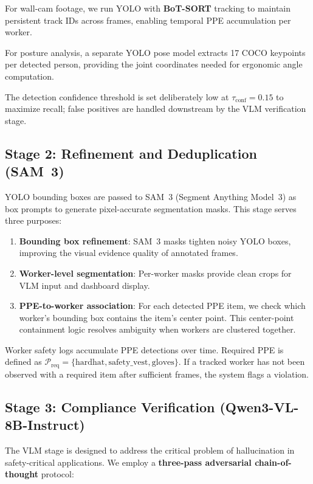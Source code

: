 \documentclass[11pt, twocolumn]{article}
\begin{document}
For wall-cam footage, we run YOLO with \textbf{BoT-SORT} tracking to maintain persistent track IDs across frames, enabling temporal PPE accumulation per worker.

For posture analysis, a separate YOLO pose model extracts 17 COCO keypoints per detected person, providing the joint coordinates needed for ergonomic angle computation.

The detection confidence threshold is set deliberately low at $\tau_{\text{conf}} = 0.15$ to maximize recall; false positives are handled downstream by the VLM verification stage.

\subsection{Stage 2: Refinement and Deduplication (SAM~3)}

YOLO bounding boxes are passed to SAM~3 (Segment Anything Model~3) as box prompts to generate pixel-accurate segmentation masks. This stage serves three purposes:

\begin{enumerate}[nosep, leftmargin=*]
    \item \textbf{Bounding box refinement}: SAM~3 masks tighten noisy YOLO boxes, improving the visual evidence quality of annotated frames.
    \item \textbf{Worker-level segmentation}: Per-worker masks provide clean crops for VLM input and dashboard display.
    \item \textbf{PPE-to-worker association}: For each detected PPE item, we check which worker's bounding box contains the item's center point. This center-point containment logic resolves ambiguity when workers are clustered together.
\end{enumerate}

Worker safety logs accumulate PPE detections over time. Required PPE is defined as $\mathcal{P}_{\text{req}} = \{\text{hardhat}, \text{safety\_vest}, \text{gloves}\}$. If a tracked worker has not been observed with a required item after sufficient frames, the system flags a violation.

\subsection{Stage 3: Compliance Verification (Qwen3-VL-8B-Instruct)}

The VLM stage is designed to address the critical problem of hallucination in safety-critical applications. We employ a \textbf{three-pass adversarial chain-of-thought} protocol:
\end{document}
